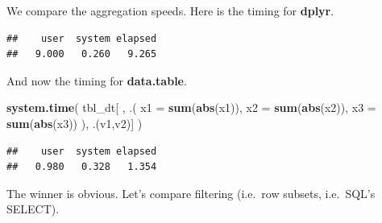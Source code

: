 \documentclass[]{book}
\newenvironment{Shaded}{\begin{snugshade}}{\end{snugshade}}
\newcommand{\KeywordTok}[1]{\textcolor[rgb]{0.13,0.29,0.53}{\textbf{#1}}}
\newcommand{\DataTypeTok}[1]{\textcolor[rgb]{0.13,0.29,0.53}{#1}}
\newcommand{\StringTok}[1]{\textcolor[rgb]{0.31,0.60,0.02}{#1}}
\newcommand{\OperatorTok}[1]{\textcolor[rgb]{0.81,0.36,0.00}{\textbf{#1}}}
\newcommand{\NormalTok}[1]{#1}
\theoremstyle{definition}
\theoremstyle{definition}
\theoremstyle{definition}
\theoremstyle{remark}
\begin{document}
We compare the aggregation speeds. Here is the timing for
\textbf{dplyr}.

\begin{Shaded}
\end{Shaded}

\begin{verbatim}
##    user  system elapsed 
##   9.000   0.260   9.265
\end{verbatim}

And now the timing for \textbf{data.table}.

\begin{Shaded}
\begin{Highlighting}[]
\KeywordTok{system.time}\NormalTok{( }
\NormalTok{  tbl_dt[ ,  .( }\DataTypeTok{x1 =} \KeywordTok{sum}\NormalTok{(}\KeywordTok{abs}\NormalTok{(x1)), }\DataTypeTok{x2 =} \KeywordTok{sum}\NormalTok{(}\KeywordTok{abs}\NormalTok{(x2)), }\DataTypeTok{x3 =} \KeywordTok{sum}\NormalTok{(}\KeywordTok{abs}\NormalTok{(x3)) ), .(v1,v2)]}
\NormalTok{  )}
\end{Highlighting}
\end{Shaded}

\begin{verbatim}
##    user  system elapsed 
##   0.980   0.328   1.354
\end{verbatim}

The winner is obvious. Let's compare filtering (i.e.~row subsets,
i.e.~SQL's SELECT).

\begin{Shaded}
\end{Shaded}
\end{document}
